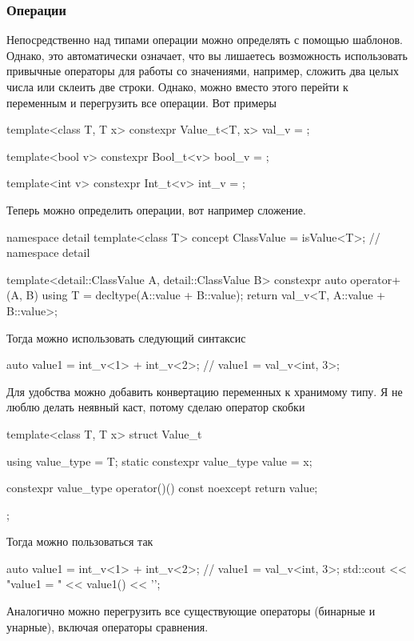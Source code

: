 \subsubsection{Операции}

Непосредственно над типами операции можно определять с помощью шаблонов.
Однако, это автоматически означает, что вы лишаетесь возможность использовать привычные операторы для работы со значениями, например, сложить два целых числа или склеить две строки.
Однако, можно вместо этого перейти к переменным и перегрузить все операции.
Вот примеры
\begin{cppcode}
template<class T, T x>
constexpr Value_t<T, x> val_v = {};

template<bool v>
constexpr Bool_t<v> bool_v = {};

template<int v>
constexpr Int_t<v> int_v = {};
\end{cppcode}
Теперь можно определить операции, вот например сложение.
\begin{cppcode}
namespace detail {
template<class T>
concept ClassValue = isValue<T>;
} // namespace detail

template<detail::ClassValue A, detail::ClassValue B>
constexpr auto operator+(A, B) {
  using T = decltype(A::value + B::value);
  return val_v<T, A::value + B::value>;
}
\end{cppcode}
Тогда можно использовать следующий синтаксис
\begin{cppcode}
auto value1 = int_v<1> + int_v<2>;
// value1 = val_v<int, 3>;
\end{cppcode}
Для удобства можно добавить конвертацию переменных к хранимому типу.
Я не люблю делать неявный каст, потому сделаю оператор скобки
\begin{cppcode}
template<class T, T x>
struct Value_t {
  using value_type = T;
  static constexpr value_type value = x;

  constexpr value_type operator()() const noexcept {
    return value;
  }
};
\end{cppcode}
Тогда можно пользоваться так
\begin{cppcode}
auto value1 = int_v<1> + int_v<2>;
// value1 = val_v<int, 3>;
std::cout << "value1 = " << value1() << '\n';
\end{cppcode}
Аналогично можно перегрузить все существующие операторы (бинарные и унарные), включая операторы сравнения.

